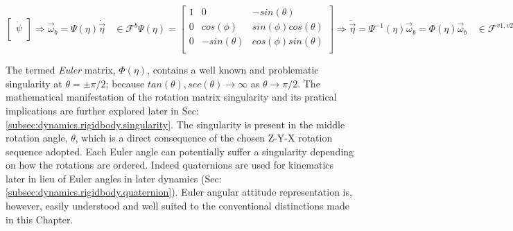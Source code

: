 \begin{subequations}
\begin{equation}
\begin{bmatrix}
\dot{\psi}\\
\end{bmatrix}
\end{equation}
\begin{equation}\label{eq:angular-rates.c}
\Rightarrow\vec{\omega}_b=\Psi(\eta)\dot{\vec{\eta}}~~~~\in\mathcal{F}^b
\end{equation}
\begin{equation}\label{eq:angular-rates.d}
\Psi(\eta)=
\begin{bmatrix}
1 & 0 & -sin(\theta)\\
0 & cos(\phi) & sin(\phi)cos(\theta)\\
0 & -sin(\theta) & cos(\phi)sin(\theta)\\
\end{bmatrix}
\end{equation}
\begin{equation}\label{eq:angular-rates.e}
\Rightarrow\dot{\vec{\eta}}=\Psi^{-1}(\eta)\vec{\omega}_b=\Phi(\eta)\vec{\omega}_b~~~~\in\mathcal{F}^{v1,v2,I}
\end{equation}
\begin{equation}\label{eq:angular-rates.f}
\Phi(\mathcal{E})=\begin{bmatrix}
1 & sin(\phi)tan(\theta) & cos(\phi)tan(\theta)\\
0 & cos(\phi) & -sin(\phi)\\
0 & sin(\phi)sec(\theta) & cos(\phi)sec(\theta)\\
\end{bmatrix}
\end{equation}
\end{subequations}
\par
The termed \emph{Euler} matrix, $\Phi(\eta)$, contains a well known and problematic singularity at $\theta=\pm\pi/2$; because $tan(\theta),sec(\theta)\rightarrow\infty$ as $\theta\rightarrow\pi/2$. The mathematical manifestation of the rotation matrix singularity and its pratical implications are further explored later in Sec:\ref{subsec:dynamics.rigidbody.singularity}. The singularity is present in the middle rotation angle, $\theta$, which is a direct consequence of the chosen Z-Y-X rotation sequence adopted. Each Euler angle can potentially suffer a singularity depending on how the rotations are ordered. Indeed quaternions are used for kinematics later in lieu of Euler angles in later dynamics (Sec:\ref{subsec:dynamics.rigidbody.quaternion}). Euler angular attitude representation is, however, easily understood and well suited to the conventional distinctions made in this Chapter.
